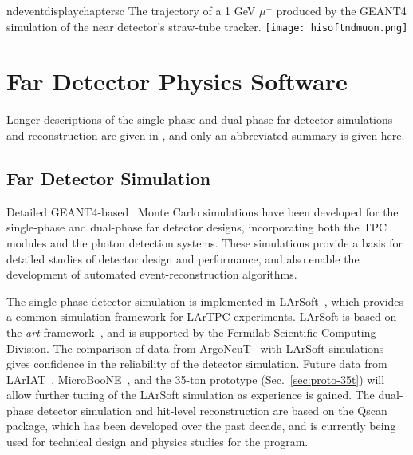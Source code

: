 \begin{cdrfigure}{ndeventdisplaychaptersc}
{The trajectory of a 1 GeV $\mu^-$ produced by the GEANT4 simulation of the near detector's straw-tube tracker.}
\texttt{[image: hisoftndmuon.png]}
\end{cdrfigure}

\section{Far Detector Physics Software}
\label{sec:detectors-sc-physics-software}

Longer descriptions of the single-phase and dual-phase far detector
simulations and reconstruction are given in \anxreco, and only an
abbreviated summary is given here.

%

\subsection{Far Detector Simulation}
\label{sec:detectors-sc-physics-software-simulation-fd}

Detailed GEANT4-based~\cite{GEANT4:NIM,GEANT4} Monte Carlo simulations
have been developed for the single-phase and dual-phase far detector
designs, incorporating both the TPC modules and the photon detection
systems. These simulations provide a basis for detailed studies of
detector design and performance, and also enable the development of
automated event-reconstruction algorithms.

The single-phase detector simulation is implemented in
LArSoft~\cite{Church:2013hea}, which provides a common simulation
framework for LArTPC experiments.  LArSoft is based on the {\it art}
framework~\cite{Green:2012gv}, and is supported by the Fermilab
Scientific Computing Division.  The comparison of data from
ArgoNeuT~\cite{Anderson:2012vc,Anderson:2012mra} with LArSoft
simulations gives confidence in the reliability of the detector
simulation.  Future data from
LArIAT~\cite{Adamson:2013/02/28tla,Cavanna:2014iqa},
MicroBooNE~\cite{Chen:2007ae,Jones:2011ci,microboonecdr}, and the
35-ton prototype (Sec.~\ref{sec:proto-35t}) will allow further tuning
of the LArSoft simulation as experience is gained.  The dual-phase
detector simulation and hit-level reconstruction are based on the
Qscan~\cite{lussi:thesis} package, which has been developed over the
past decade, and is currently being used for technical design and
physics studies for the \cerndualproto{} program.

